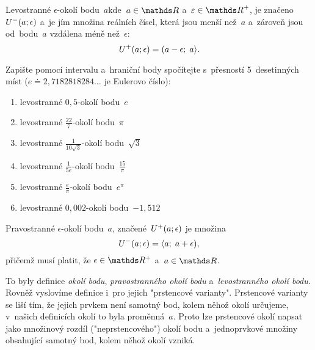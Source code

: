 \begin{definition}
    Levostranné $\epsilon$-okolí bodu~$a$kde~${a \in \reals}$
    a~${\varepsilon \in \positive{\reals}}$, je značeno~${{U}^{-}(a; \epsilon)}$
    a~je jím množina reálních čísel, která jsou menší než~$a$ a~zároveň jsou
    od~bodu~$a$ vzdálena méně než~$\epsilon$:
    \begin{equation*}
        {U}^{+}(a; \epsilon) = (a - \epsilon;\; a \rangle.
    \end{equation*}
\end{definition}

\begin{exercise}
    Zapište pomocí intervalu a~hraniční body spočítejte s~přesností 5~desetinných
    míst (${e \doteq 2,7182818284\dots}$ je Eulerovo číslo):
    \begin{enumerate}[label=(\alph*)]
        \item levostranné $0,5$-okolí bodu~$e$
        \item levostranné $\frac{22}{7}$-okolí bodu~$\pi$
        \item levostranné $\frac{1}{10\sqrt{3}}$-okolí bodu~$\sqrt{3}$
        \item levostranné $\frac{1}{5e}$-okolí bodu~$\frac{15}{\pi}$
        \item levostranné $\frac{e}{\pi}$-okolí bodu~$e^\pi$
        \item levostranné $0,002$-okolí bodu~$-1,512$
    \end{enumerate}
\end{exercise}

\begin{definition}
    Pravostranné $\epsilon$-okolí bodu~$a$, značené~${{U}^{+}(a; \epsilon)}$
    je množina
    \begin{equation*}
        {U}^{-}(a; \epsilon) = \langle a;\; a + \epsilon),
    \end{equation*}
    přičemž musí platit, že ${\epsilon \in \reals^{+}}$ a~${a \in \reals}$.
\end{definition}

To byly definice \emph{okolí bodu}, \emph{pravostranného okolí bodu}
a~\emph{levostranného okolí bodu}.
Rovněž vyslovíme definice i~pro jejich "prstencové varianty".
Prstencové varianty se liší tím, že jejich prvkem není samotný bod, kolem něhož okolí
určujeme, v~našich definicích okolí to byla proměnná~$a$.
Proto lze prstencové okolí napsat jako množinový rozdíl ("neprstencového") okolí bodu
a~jednoprvkové množiny obsahující samotný bod, kolem něhož okolí vzniká.

